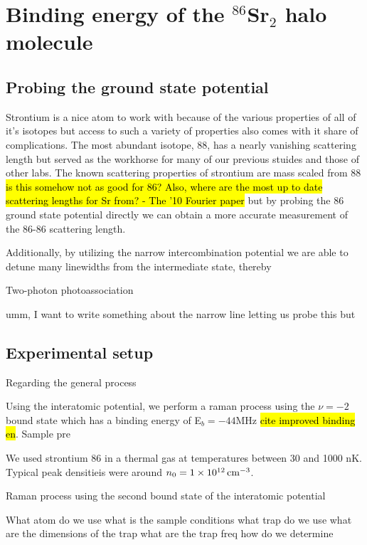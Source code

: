 \chapter{Binding energy of the $^{86}$Sr$_2$ halo molecule}
\label{ch:chap4}

\section{Probing the ground state potential}
\label{sec:lowE_intro}

Strontium is a nice atom to work with because of the various properties of all of it's isotopes but access to such a variety of properties also comes with it share of complications. The most abundant isotope, 88, has a nearly vanishing scattering length but served as the workhorse for many of our previous stuides and those of other labs. The known scattering properties of strontium are mass scaled from 88 \hl{is this somehow not as good for 86? Also, where are the most up to date scattering lengths for Sr from? - The '10 Fourier paper} but by probing the 86 ground state potential directly we can obtain a more accurate measurement of the 86-86 scattering length.

Additionally, by utilizing the narrow intercombination potential we are able to detune many linewidths from the intermediate state, thereby 

Two-photon photoassociation 

umm, I want to write something about the narrow line letting us probe this but 

\section{Experimental setup}
\label{sec:lowE_setup}

Regarding the general process 

Using the \intPot{\gs}{\ex} interatomic potential, we perform a raman process using the $\nu=-2$ bound state which has a binding energy of E$_b=-44 \text{MHz}$ \hl{cite improved binding en}. Sample pre 

We used strontium 86 in a thermal gas at temperatures between 30 and 1000 nK. Typical peak densitieis were around $n_0 = 1 \times 10^{12} \, \text{cm}^{-3}$. 

Raman process using the second bound state of the \intPot{\gs}{\ex} interatomic potential

What atom do we use
what is the sample conditions
what trap do we use
what are the dimensions of the trap
what are the trap freq
how do we determine 

